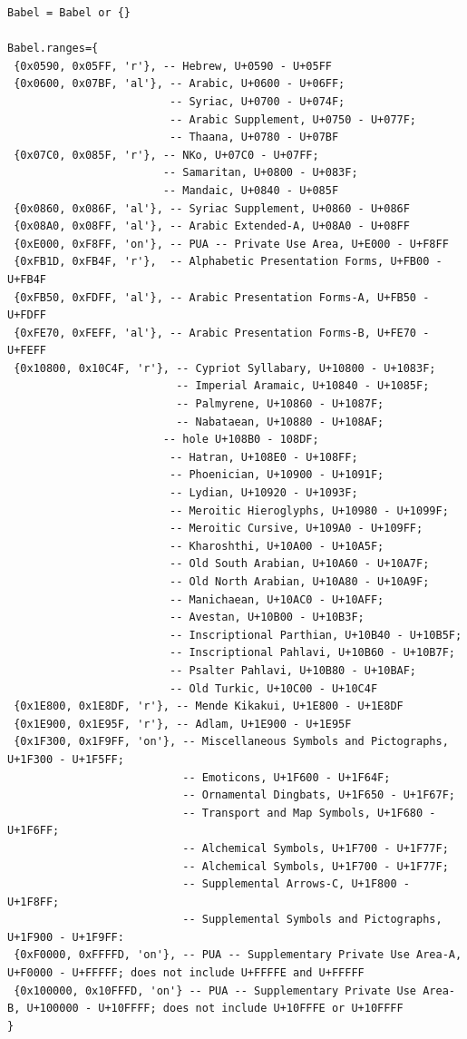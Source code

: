 \documentclass[12pt, twoside]{article}
\begin{document}
\begin{lstlisting}[language={[5.2]Lua}, caption={Babel table and Babel-ranges supplemented with additional comments about Unicode blocks}, label=lst:BabelTableandRanges]
Babel = Babel or {}

Babel.ranges={
 {0x0590, 0x05FF, 'r'}, -- Hebrew, U+0590 - U+05FF
 {0x0600, 0x07BF, 'al'}, -- Arabic, U+0600 - U+06FF;
                         -- Syriac, U+0700 - U+074F;
                         -- Arabic Supplement, U+0750 - U+077F;
                         -- Thaana, U+0780 - U+07BF
 {0x07C0, 0x085F, 'r'}, -- NKo, U+07C0 - U+07FF;
                        -- Samaritan, U+0800 - U+083F;
                        -- Mandaic, U+0840 - U+085F
 {0x0860, 0x086F, 'al'}, -- Syriac Supplement, U+0860 - U+086F
 {0x08A0, 0x08FF, 'al'}, -- Arabic Extended-A, U+08A0 - U+08FF
 {0xE000, 0xF8FF, 'on'}, -- PUA -- Private Use Area, U+E000 - U+F8FF
 {0xFB1D, 0xFB4F, 'r'},  -- Alphabetic Presentation Forms, U+FB00 - U+FB4F
 {0xFB50, 0xFDFF, 'al'}, -- Arabic Presentation Forms-A, U+FB50 - U+FDFF
 {0xFE70, 0xFEFF, 'al'}, -- Arabic Presentation Forms-B, U+FE70 - U+FEFF
 {0x10800, 0x10C4F, 'r'}, -- Cypriot Syllabary, U+10800 - U+1083F;
                          -- Imperial Aramaic, U+10840 - U+1085F;
                          -- Palmyrene, U+10860 - U+1087F;
                          -- Nabataean, U+10880 - U+108AF; 
                        -- hole U+108B0 - 108DF;
                         -- Hatran, U+108E0 - U+108FF;
                         -- Phoenician, U+10900 - U+1091F;
                         -- Lydian, U+10920 - U+1093F;
                         -- Meroitic Hieroglyphs, U+10980 - U+1099F;
                         -- Meroitic Cursive, U+109A0 - U+109FF;
                         -- Kharoshthi, U+10A00 - U+10A5F;
                         -- Old South Arabian, U+10A60 - U+10A7F;
                         -- Old North Arabian, U+10A80 - U+10A9F;
                         -- Manichaean, U+10AC0 - U+10AFF;
                         -- Avestan, U+10B00 - U+10B3F;
                         -- Inscriptional Parthian, U+10B40 - U+10B5F;
                         -- Inscriptional Pahlavi, U+10B60 - U+10B7F;
                         -- Psalter Pahlavi, U+10B80 - U+10BAF;
                         -- Old Turkic, U+10C00 - U+10C4F
 {0x1E800, 0x1E8DF, 'r'}, -- Mende Kikakui, U+1E800 - U+1E8DF
 {0x1E900, 0x1E95F, 'r'}, -- Adlam, U+1E900 - U+1E95F
 {0x1F300, 0x1F9FF, 'on'}, -- Miscellaneous Symbols and Pictographs, U+1F300 - U+1F5FF;
                           -- Emoticons, U+1F600 - U+1F64F;
                           -- Ornamental Dingbats, U+1F650 - U+1F67F;
                           -- Transport and Map Symbols, U+1F680 - U+1F6FF;
                           -- Alchemical Symbols, U+1F700 - U+1F77F;
                           -- Alchemical Symbols, U+1F700 - U+1F77F;
                           -- Supplemental Arrows-C, U+1F800 - U+1F8FF;
                           -- Supplemental Symbols and Pictographs, U+1F900 - U+1F9FF:
 {0xF0000, 0xFFFFD, 'on'}, -- PUA -- Supplementary Private Use Area-A, U+F0000 - U+FFFFF; does not include U+FFFFE and U+FFFFF 
 {0x100000, 0x10FFFD, 'on'} -- PUA -- Supplementary Private Use Area-B, U+100000 - U+10FFFF; does not include U+10FFFE or U+10FFFF
}
\end{lstlisting}
\end{document}
